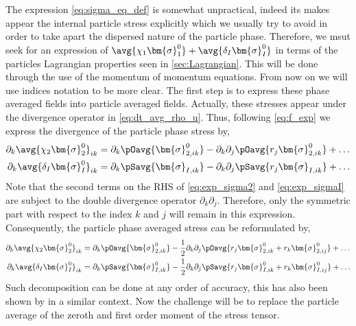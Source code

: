 The expression \ref{eq:sigma_eq_def} is somewhat unpractical, indeed its makes appear the internal particle stress explicitly which we usually try to avoid in order to take apart the dispersed nature of the particle phase. 
Therefore, we msut seek for an expression of $\avg{\chi_1\bm{\sigma}_1^0}
+ \avg{\delta_I \bm{\sigma}_I^0}$ in terms of the particles Lagrangian properties seen in \ref{sec:Lagrangian}.
This will be done through the use of the momentum of momentum equations. 
From now on we will use indices notation to be more clear. 
The first step is to express these phase averaged fields into particle averaged fields. 
Actually, these stresses appear under the divergence operator in \ref{eq:dt_avg_rho_u}. 
Thus, following \ref{eq:f_exp} we express the divergence of the particle phase stress by, 
\begin{align}
    \label{eq:exp_sigma2}
    \partial_k \avg{\chi_2\bm{\sigma}_2^0}_{ik}
    &=  \partial_k\pOavg{ \bm{\sigma}^0_{2,ik}}
    - \partial_k\partial_j
    \pOavg{ r_j\bm{\sigma}^0_{2,ik}}        
    + \ldots  \\
    \label{eq:exp_sigmaI}
    \partial_k \avg{\delta_I \bm{\sigma}_I^0}_{ik} 
    &=  \partial_k\pSavg{ \bm{\sigma}_{I,ik} }
        - \partial_k\partial_j \pSavg{ r_j \bm{\sigma}_{I,ik} }
        + \ldots  
\end{align}
Note that the second terms on the RHS of \ref{eq:exp_sigma2} and \ref{eq:exp_sigmaI} are subject to the double divergence operator $\partial_k\partial_j$. 
Therefore, only the symmetric part with respect to the index $k$ and $j$ will remain in this expression. 
Consequently, the particle phase averaged stress can be reformulated by, 
\begin{align}
    \label{eq:exp_sigma22}
    \partial_k \avg{\chi_2\bm{\sigma}_2^0}_{ik}
    &=  \partial_k\pOavg{ \bm{\sigma}^0_{2,ik}}
    -\frac{1}{2} \partial_k\partial_j
    \pOavg{ r_j \bm{\sigma}^0_{2,ik} + r_k\bm{\sigma}^0_{2,ij}}
    + \ldots  \\
    \label{eq:exp_sigmaI2}
    \partial_k \avg{\delta_I \bm{\sigma}_I^0}_{ik} 
    &=  \partial_k\pSavg{ \bm{\sigma}_{I,ik}^0 }
        -\frac{1}{2} \partial_k\partial_j \pSavg{ r_j \bm{\sigma}_{I,ik}^0+r_k \bm{\sigma}_{I,ij}^0 }
        + \ldots  
\end{align}
Such decomposition can be done at any order of accuracy, this has also been shown by \citet[Appendix A]{nott2011suspension} in a similar context. 
Now the challenge will be to replace the particle average of the zeroth and first order moment of the stress tensor. 
